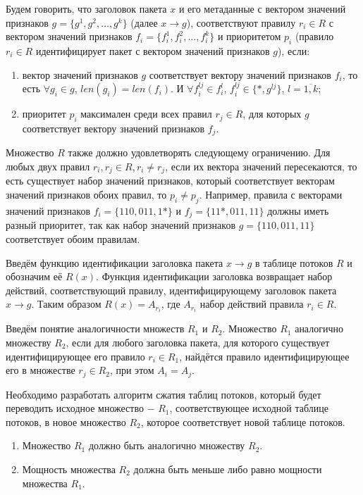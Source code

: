 \documentclass[a4paper, 12pt, titlepage, finall]{extreport}
\begin{document}
        Будем говорить, что заголовок пакета \(x\) и его метаданные с вектором значений признаков \(g=\{g^1,g^2,\ldots,g^k\}\) (далее \(x \rightarrow g\)),
        соответствуют правилу \(r_i\in R\) с вектором значений признаков \(f_i=\{f_i^1,f_i^2,\ldots,f_i^k\}\) 
        и приоритетом \(p_i\) (правило \(r_i\in R\) идентифицирует пакет с вектором значений признаков \(g\)), если:

        \begin{enumerate}
            \item вектор значений признаков \(g\) соответствует вектору значений признаков \(f_i\), 
                то есть \(\forall g_i \in g\), \(len(g_i) = len(f_i)\). И \(\forall f_i^{lj} \in f_i^l\), \(f_i^{lj} \in \{*, g^{lj}\}\), \(l=\overline{1,k}\);
            \item приоритет \(p_i\) максимален среди всех правил \(r_j\in R\), для которых \(g\) соответствует вектору значений признаков \(f_j\).
        \end{enumerate}

        Множество \(R\) также должно удовлетворять следующему ограничению. 
        Для любых двух правил \(r_i,r_j\in R,r_i\not= r_j\), если их вектора значений пересекаются, то есть существует набор значений признаков, 
        который соответствует векторам значений признаков обоих правил, то \(p_i\not= p_j\). 
        Например, правила с векторами значений признаков \(f_i=\{110, 011, 1*\}\) и \(f_j=\{11*, 011, 11\}\) должны иметь разный приоритет, 
        так как набор значений признаков \(g=\{110, 011, 11\}\) соответствует обоим правилам.
        
        Введём функцию идентификации заголовка пакета \(x \rightarrow g\) в таблице потоков \(R\) и обозначим её \(R(x)\).
        Функция идентификации заголовка возвращает набор действий, соответствующий правилу, идентифицирующему заголовок пакета \(x \rightarrow g\).
        Таким образом \(R(x) = A_{r_i}\), где \(A_{r_i}\) набор действий правила \(r_i \in R\).

        Введём понятие аналогичности множеств \(R_1\) и \(R_2\).
        Множество \(R_1\) аналогично множеству \(R_2\), если для любого заголовка пакета, для которого существует идентифицирующее его правило \(r_i \in R_1\), 
        найдётся правило идентифицирующее его в множестве \(r_j \in R_2\), при этом \(A_i = A_j\).

        Необходимо разработать алгоритм сжатия таблиц потоков, который будет переводить исходное множество $-$ \(R_1\), соответствующее исходной таблице потоков, в
        новое множество \(R_2\), которое соответствует новой таблице потоков.
        \begin{enumerate}
            \item Множество \(R_1\) должно быть аналогично множеству \(R_2\).
            \item Мощность множества \(R_2\) должна быть меньше либо равно мощности множества \(R_1\).
        \end{enumerate}
\end{document}
